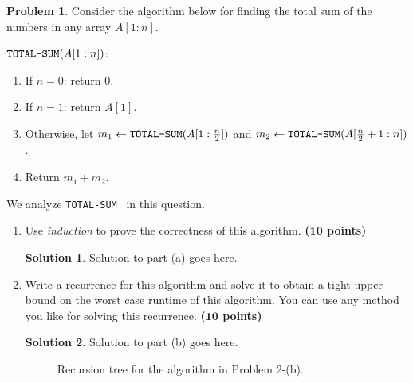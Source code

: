 \documentclass{article}
\theoremstyle{definition}
\newtheorem{problem}{Problem}
\newtheorem*{solution*}{Solution}
\newenvironment{solution}{\begin{solution*}}{{} \end{solution*}}
\newcommand{\grade}[1]{\hfill{\textbf{($\mathbf{#1}$ points)}}}
\newcommand{\totalsum}{\textnormal{\texttt{TOTAL-SUM}}}
\begin{document}
\begin{problem}\label{induction}
	Consider the algorithm below for finding the total sum of the numbers in any array $A[1:n]$.  
	
	\medskip
	
	$\totalsum (A[1:n])$: \vspace{-0.4cm}
	\medskip
	\begin{enumerate}
		\item If $n=0$: return $0$. 
		\item If $n=1$: return $A[1]$.
		\item Otherwise, let $m_1 \leftarrow \totalsum(A[1:\frac n2])$ and $m_2 \leftarrow \totalsum(A[\frac n2+1:n])$. 
		\item Return  $m_1 + m_2$. 
	\end{enumerate}
	We analyze \totalsum~ in this question. 
	\begin{enumerate}[label=(\alph*)]
		\item Use \emph{induction} to prove the correctness of this algorithm. \grade{10}

\bigskip
		\begin{solution}
	Solution to part (a) goes here. 
	\end{solution}


		
		\newpage
		\item Write a recurrence for this algorithm and solve it to obtain a tight upper bound on the worst case runtime of this algorithm. You can use any method you like for solving this recurrence. 		\grade{10}
	\bigskip	
				\begin{solution}
	Solution to part (b) goes here. 
	\begin{figure}[h!]
			\centering
		\caption{Recursion tree for the algorithm in Problem 2-(b).} 
	\end{figure}
\end{solution}


	\end{enumerate}
\end{problem} 

\newpage
\end{document}
